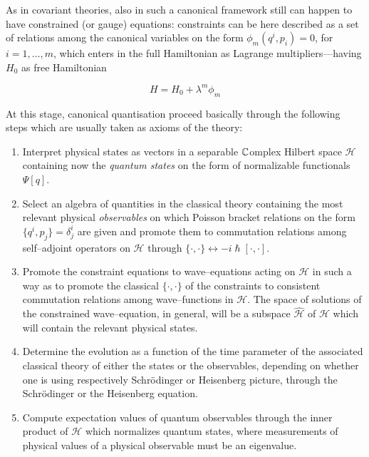    As in covariant theories, also in such a canonical framework still can happen to have constrained (or gauge) equations: constraints can be here described as a set of relations among the canonical variables on the form $\phi_m(q^i,p_i)=0$, for $i=1,\hdots,m$, which enters in the full Hamiltonian as Lagrange multipliers---having $H_0$ as free Hamiltonian

    $$H=H_0+\lambda^m\phi_m$$

At this stage, canonical quantisation proceed basically through the following steps which are usually taken as axioms of the theory:

\begin{enumerate}\label{first_quantisation}

    \item Interpret physical states as vectors in a separable $\mathbb{C}$omplex Hilbert space $\mathcal{H}$ containing now the \emph{quantum states} on the form of normalizable functionals $\Psi[q]$.
    \item Select an algebra of quantities in the classical theory containing the most relevant physical \emph{observables} on which Poisson bracket relations on the form $\{q^i,p_j\}=\delta^i_j$ are given and promote them to commutation relations among self--adjoint operators on $\mathcal{H}$ through $\{\cdot,\cdot\}\leftrightarrow-i\hslash[\cdot,\cdot]$.
    

    \item Promote the constraint equations to wave--equations acting on $\mathcal{H}$ %
    in such a way as to promote the classical $\{\cdot,\cdot\}$ of the constraints to consistent commutation relations among wave--functions in $\mathcal{H}$. The space of solutions of the constrained wave--equation, in general, will be a subspace $\widehat{\mathcal{H}}$ of $\mathcal{H}$ which will contain the relevant physical states.

    \item Determine the evolution as a function of the time parameter of the associated classical theory of either the states or the observables, depending on whether one is using respectively Schrödinger or Heisenberg picture, through the Schrödinger or the Heisenberg equation.

    \item Compute expectation values of quantum observables through the inner product of $\mathcal{H}$ which normalizes quantum states, where measurements of physical values of a physical observable must be an eigenvalue.

\end{enumerate}


